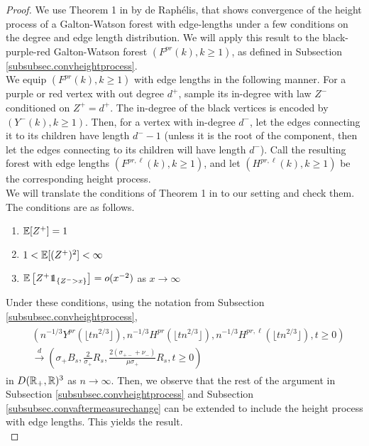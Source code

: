 \begin{proof}
We use Theorem 1 in \cite{deraphelisScalingLimitMultitype2017} by de Raphélis, that shows convergence of the height process of a Galton-Watson forest with edge-lengths under a few conditions on the degree and edge length distribution. We will apply this result to the black-purple-red Galton-Watson forest $(F^{pr}(k),k\geq 1)$, as defined in Subsection \ref{subsubsec.convheightprocess}. \\
We equip $(F^{pr}(k),k\geq 1)$ with edge lengths in the following manner. For a purple or red vertex with out degree $d^+$, sample its in-degree with law $Z^-$ conditioned on $Z^+=d^+$. The in-degree of the black vertices is encoded by $(Y^{-}(k),k\geq 1)$.  Then, for a vertex with in-degree $d^-$, let the edges connecting it to its children have length $d^--1$ (unless it is the root of the component, then let the edges connecting to its children will have length $d^-$). Call the resulting forest with edge lengths $(F^{pr,\ell}(k),k\geq 1)$, and let $(H^{pr,\ell}(k),k\geq 1)$ be the corresponding height process.\\
We will translate the conditions of Theorem 1 in \cite{deraphelisScalingLimitMultitype2017} to our setting and check them. The conditions are as follows.
\begin{enumerate}
    \item ${\mathbb E}[Z^+]=1$
    \item $1<{\mathbb E}[(Z^+)^2]<\infty$
    \item $\E\left[Z^+\one_{\{Z^->x\}}\right]=o(x^{-2})$ as $x\to \infty$
\end{enumerate}
Under these conditions, using the notation from Subsection \ref{subsubsec.convheightprocess},
\begin{align}\begin{split}\label{eq.convmodifiedheightprocess}
&\left(n^{-1/3}Y^{pr}\left(\lfloor t n^{2/3}\rfloor \right),n^{-1/3}H^{pr}\left(\lfloor t n^{2/3}\rfloor \right), n^{-1/3}H^{pr,\ell}\left(\lfloor t n^{2/3}\rfloor \right),t\geq 0\right)\\
&\overset{d}{\to}\left(\sigma_+ B_s, \frac{2}{\sigma_+}R_s, \frac{2(\sigma_{+-}+\nu_-)}{\mu\sigma_+}R_s,t\geq 0\right)
\end{split}\end{align}
in $D({\mathbb R}_+,{\mathbb R})^3$ as $n\to \infty$. 
Then, we observe that the rest of the argument in Subsection \ref{subsubsec.convheightprocess} and Subsection \ref{subsubsec.convaftermeasurechange} can be extended to include the height process with edge lengths. This yields the result.\\

\end{proof}
